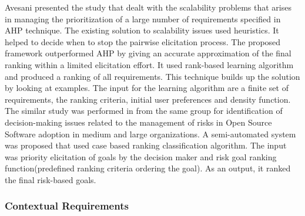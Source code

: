 	Avesani \etal\cite{PAvesani} presented the study that dealt with the scalability problems
that arises in managing the prioritization of a large number of requirements
specified in AHP technique.  The existing solution to scalability issues used
heuristics. It helped to decide when to stop the pairwise elicitation process.
The proposed framework outperformed AHP by giving an accurate approximation of
the final ranking within a limited elicitation effort. It used rank-based
learning algorithm and produced a ranking of all requirements. This technique
builds up the solution by looking at examples. The input for the learning
algorithm are a finite set of requirements, the ranking criteria, initial user
preferences and density function.\\

	The similar study was performed in \cite{7320432}from the same group
\cite{PAvesani} for identification of decision-making issues related to the
management of risks in Open Source Software adoption in medium and large
organizations. A  semi-automated system was proposed that used case based
ranking classification algorithm. The input was priority elicitation of goals by
the decision maker and risk goal ranking function(predefined ranking criteria
ordering the goal). As an output, it ranked the final risk-based goals.\\



\subsubsection{Contextual Requirements} 

